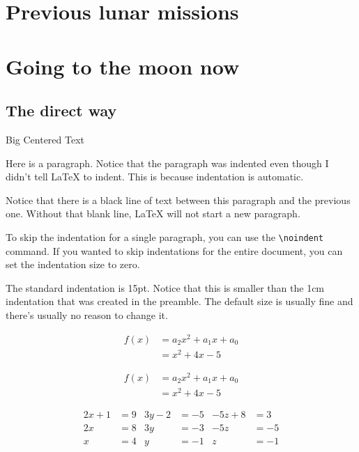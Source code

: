 \documentclass{article}
\begin{document}
	
	\tableofcontents
	\section{Previous lunar missions}
	\section{Going to the moon now}
	\subsection{The direct way}
	
	
	\begin{center}
		{\Huge Big Centered Text}
	\end{center}
	
	Here is a paragraph. Notice that the paragraph was indented even though I didn't tell
	\LaTeX{} to indent. This is because indentation is automatic.
	
	Notice that there is a black line of text between this paragraph and the previous one. 
	Without that blank line, \LaTeX{} will not start a new paragraph.
	
	\noindent To skip the indentation for a single paragraph, you can use  the \verb|\noindent|
	command. If you wanted to skip indentations for the entire document, you can set the 
	indentation size to zero.
	
	\setlength{\parindent}{15pt}
	
	The standard indentation is 15pt. Notice that this is smaller than the 1cm indentation
	that was created in the preamble. The default size is usually fine and there's usually
	no reason to change it.
	
	\begin{align}
		f(x) & = a_2 x^2 + a_1 x + a_0 \\
		& = x^2 + 4x - 5
	\end{align}
	
	\begin{align}
		f(x) & = a_2 x^2 + a_1 x + a_0 \nonumber \\
		     & = x^2 + 4x - 5
	\end{align}

	\begin{align*}
		2x + 1 & = 9 	& 	3y - 2 & = -5 	& -5z + 8 & = 3 \\
		2x & = 8 	&     3y & = -3 	&     -5z & = -5 \\ 
		x & = 4		& 	y & = -1	& 	z & = -1
	\end{align*}
\end{document}
